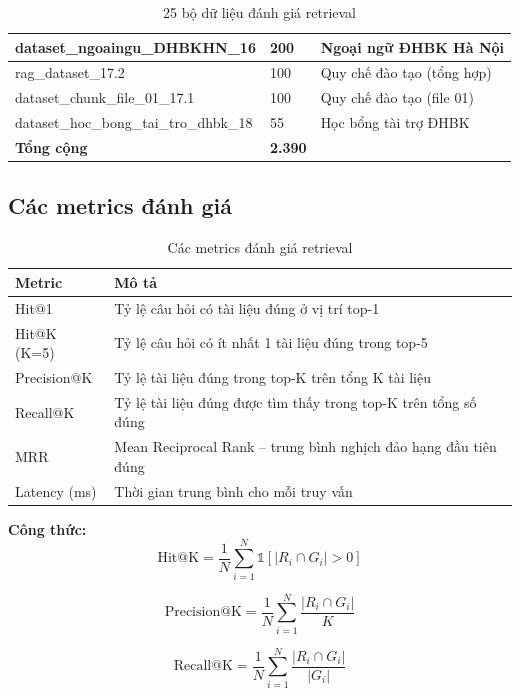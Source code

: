 \documentclass[../DoAn.tex]{subfiles}
\begin{document}
\begin{table}[H]
\begin{tabular}{|l|l|p{5.5cm}|}
\hline
dataset\_ngoaingu\_DHBKHN\_16 & 200 & Ngoại ngữ ĐHBK Hà Nội \\
\hline
rag\_dataset\_17.2 & 100 & Quy chế đào tạo (tổng hợp) \\
\hline
dataset\_chunk\_file\_01\_17.1 & 100 & Quy chế đào tạo (file 01) \\
\hline
dataset\_hoc\_bong\_tai\_tro\_dhbk\_18 & 55 & Học bổng tài trợ ĐHBK \\
\hline
\hline
\textbf{Tổng cộng} & \textbf{2.390} & \\
\hline
\end{tabular}
\caption{25 bộ dữ liệu đánh giá retrieval}
\end{table}

\subsection{Các metrics đánh giá}

\begin{table}[h]
\centering
\begin{tabular}{|l|p{10cm}|}
\hline
\textbf{Metric} & \textbf{Mô tả} \\
\hline
Hit@1 & Tỷ lệ câu hỏi có tài liệu đúng ở vị trí top-1 \\
\hline
Hit@K (K=5) & Tỷ lệ câu hỏi có ít nhất 1 tài liệu đúng trong top-5 \\
\hline
Precision@K & Tỷ lệ tài liệu đúng trong top-K trên tổng K tài liệu \\
\hline
Recall@K & Tỷ lệ tài liệu đúng được tìm thấy trong top-K trên tổng số đúng \\
\hline
MRR & Mean Reciprocal Rank -- trung bình nghịch đảo hạng đầu tiên đúng \\
\hline
Latency (ms) & Thời gian trung bình cho mỗi truy vấn \\
\hline
\end{tabular}
\caption{Các metrics đánh giá retrieval}
\end{table}

\textbf{Công thức:}
\begin{equation}
\text{Hit@K} = \frac{1}{N} \sum_{i=1}^{N} \mathbb{1}\left[ |R_i \cap G_i| > 0 \right]
\end{equation}

\begin{equation}
\text{Precision@K} = \frac{1}{N} \sum_{i=1}^{N} \frac{|R_i \cap G_i|}{K}
\end{equation}

\begin{equation}
\text{Recall@K} = \frac{1}{N} \sum_{i=1}^{N} \frac{|R_i \cap G_i|}{|G_i|}
\end{equation}
\end{document}
